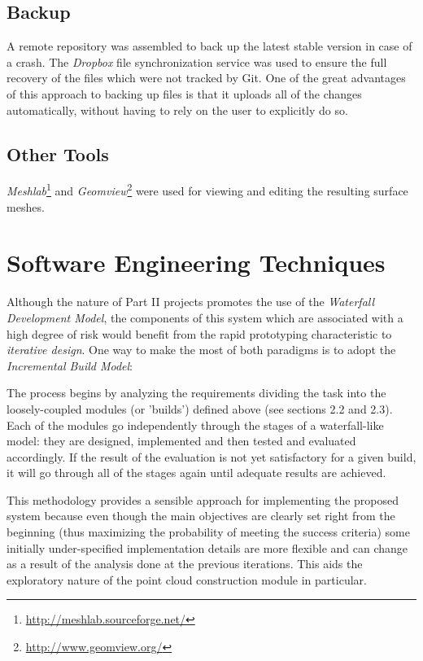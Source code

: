 \documentclass[12pt,a4paper,twoside,openright]{report}
\begin{document}
\subsection{Backup}
A remote repository was assembled to back up the latest stable version in case of a crash. The \emph{Dropbox} file synchronization service was used to ensure the full recovery of the files which were not tracked by Git. One of the great advantages of this approach to backing up files is that it uploads all of the changes automatically, without having to rely on the user to explicitly do so.  
\subsection{Other Tools}
\textit{Meshlab}\footnote{\url{http://meshlab.sourceforge.net/}} and \textit{Geomview}\footnote{\url{http://www.geomview.org/}} were used for  viewing and editing the resulting surface meshes. 

\section{Software Engineering Techniques}
Although the nature of Part II projects promotes the use of the \emph{Waterfall Development Model}, the components of this system which are associated with a high degree of risk would benefit from the rapid prototyping characteristic to \emph{iterative design}. One way to make the most of both paradigms is to adopt the \emph{Incremental Build Model}:\\
\begin{adjustwidth}{0.7cm}{}
The process begins by analyzing the requirements dividing the task into the loosely-coupled modules (or 'builds') defined above (see sections 2.2 and 2.3). Each of the modules go independently through the stages of a waterfall-like model: they are designed, implemented and then tested and evaluated accordingly. If the result of the evaluation is not yet satisfactory for a given build, it will go through all of the stages again until adequate results are achieved.\\
\end{adjustwidth} 
This methodology provides a sensible approach for implementing the proposed system because even though the main objectives are clearly set right from the beginning (thus maximizing the probability of meeting the success criteria) some initially under-specified implementation details are more flexible and can change as a result of the analysis done at the previous iterations. This aids the exploratory nature of the point cloud construction module in particular.  
\end{document}
